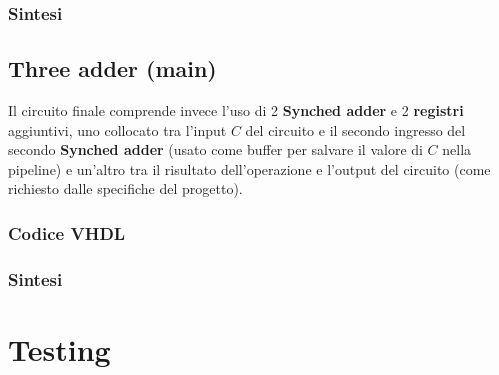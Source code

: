 \documentclass[12pt]{article}
\begin{document}
        \subsubsection{Sintesi}

    \subsection{Three adder (main)}
        Il circuito finale comprende invece l'uso di 2 \textbf{Synched adder} e 2 \textbf{registri} aggiuntivi, uno collocato tra l'input $C$ del circuito e il secondo ingresso del secondo \textbf{Synched adder} (usato come buffer per salvare il valore di $C$ nella pipeline) e un'altro tra il risultato dell'operazione e l'output del circuito (come richiesto dalle specifiche del progetto).

        \subsubsection{Codice VHDL}
        
        \subsubsection{Sintesi}

\section{Testing}
\end{document}
